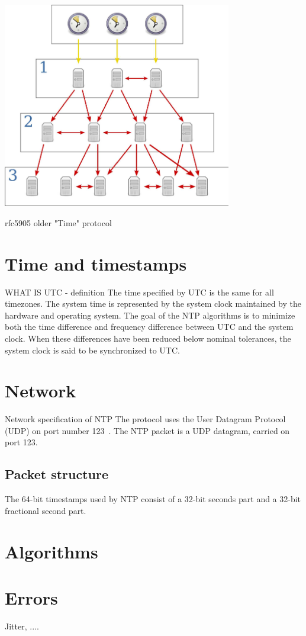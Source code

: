 \includegraphics[width=10cm,keepaspectratio]{fig/Network_Time_Protocol_servers_and_clients.pdf}


\! 
\! rfc5905
\! older "Time" protocol


\section{Time and timestamps}
\!WHAT IS UTC - definition
The time specified by UTC is the same for all timezones.
The system time is represented by the system clock maintained by
the hardware and operating system.
The goal of the NTP algorithms is to minimize
both the time difference and frequency difference between UTC and the system clock.
When these differences have been reduced below nominal
tolerances, the system clock is said to be synchronized to UTC.

\section{Network}\label{sec:ntp-network}
Network specification of NTP 
The protocol uses the User Datagram Protocol (UDP) on port number 123~\cite{ianna-ports}.
The NTP packet is a UDP datagram, carried on port 123.

\subsection{Packet structure}
The 64-bit timestamps used by NTP consist of a 32-bit seconds part and a 32-bit fractional second part.

\section{Algorithms}

\section{Errors}
Jitter, ....
